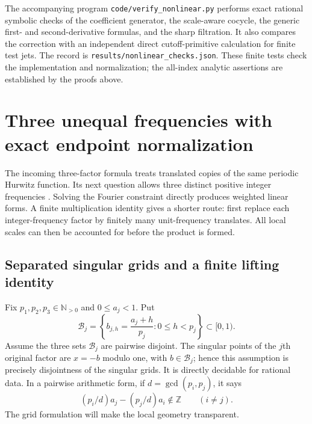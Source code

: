\documentclass[11pt,a4paper]{article}
\numberwithin{equation}{section}
\theoremstyle{definition}
\theoremstyle{remark}
\newcommand{\Z}{\mathbb Z}
\newcommand{\N}{\mathbb N}
\newcommand{\src}[1]{\nolinkurl{#1}}
\begin{document}
The accompanying program \src{code/verify_nonlinear.py} performs exact
rational symbolic checks of the coefficient generator, the scale-aware
cocycle, the generic first- and second-derivative formulas, and the sharp
filtration. It also compares the correction with an independent direct
cutoff-primitive calculation for finite test jets. The record is
\src{results/nonlinear_checks.json}. These finite tests check the
implementation and normalization; the all-index analytic assertions
are established by the proofs above.


\section{Three unequal frequencies with exact endpoint normalization}
\label{tr:section}

The incoming three-factor formula treats translated copies of the same
periodic Hurwitz function. Its next question allows three distinct positive
integer frequencies \cite{incoming-sh}. Solving the Fourier constraint
directly produces weighted linear forms. A finite multiplication identity
gives a shorter route: first replace each integer-frequency factor by
finitely many unit-frequency translates. All local scales can then be
accounted for before the product is formed.

\subsection{Separated singular grids and a finite lifting identity}
Fix $p_1,p_2,p_3\in\N_{>0}$ and $0\leq a_j<1$. Put
\begin{equation}\label{tr:grids}
 \mathcal B_j=\left\{b_{j,h}=\frac{a_j+h}{p_j}:
                       0\leq h<p_j\right\}\subset[0,1).
\end{equation}
Assume the three sets $\mathcal B_j$ are pairwise disjoint. The singular
points of the $j$th original factor are $x=-b$ modulo one, with
$b\in\mathcal B_j$; hence this assumption is precisely disjointness of
the singular grids. It is directly decidable for rational data. In a
pairwise arithmetic form, if $d=\gcd(p_i,p_j)$, it says
\[
 (p_i/d)a_j-(p_j/d)a_i\notin\Z\qquad(i\ne j).
\]
The grid formulation will make the local geometry transparent.
\end{document}
